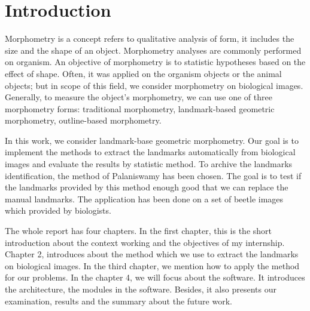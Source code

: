 \chapter*{Introduction}
Morphometry is a concept refers to qualitative analysis of form, it includes the size and the shape of an object. Morphometry analyses are commonly performed on organism. An objective of morphometry is to statistic hypotheses based on the effect of shape. Often, it was applied on the organism objects or the animal objects; but in scope of this field, we consider morphometry on biological images. Generally, to measure the object's morphometry, we can use one of three morphometry forms: traditional morphometry, landmark-based geometric morphometry, outline-based morphometry.  

In this work, we consider landmark-base geometric morphometry. Our goal is to implement the methods to extract the landmarks automatically from biological images and evaluate the results by statistic method. To archive the landmarks identification, the method of Palaniswamy\cite{palaniswamy2010automatic} has been chosen. The goal is to test if the landmarks provided by this method enough good that we can replace the manual landmarks. The application has been done on a set of beetle images which provided by biologists.

The whole report has four chapters. In the first chapter, this is the short introduction about the context working and the objectives of my internship. Chapter 2, introduces about the method which we use to extract the landmarks on biological images. In the third chapter, we mention how to apply the method for our problems. In the chapter 4, we will focus about the software. It introduces the architecture, the modules in the software. Besides, it also presents our examination, results and the summary about the future work.